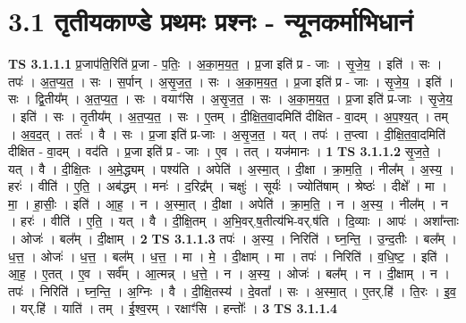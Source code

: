 \documentclass[17pt]{extarticle}
\begin{document}
\section*{ 3.1     तृतीयकाण्डे प्रथमः प्रश्नः - न्यूनकर्माभिधानं }
                                \textbf{ TS 3.1.1.1} \newline
                  प्र॒जाप॑ति॒रिति॑ प्र॒जा - प॒तिः॒ । अ॒का॒म॒य॒त॒ । प्र॒जा इति॑ प्र - जाः । सृ॒जे॒य॒ । इति॑ । सः । तपः॑ । अ॒त॒प्य॒त॒ । सः । स॒र्पान् । अ॒सृ॒ज॒त॒ । सः । अ॒का॒म॒य॒त॒ । प्र॒जा इति॑ प्र - जाः । सृ॒जे॒य॒ । इति॑ । सः । द्वि॒तीय᳚म् । अ॒त॒प्य॒त॒ । सः । वयाꣳ॑सि । अ॒सृ॒ज॒त॒ । सः । अ॒का॒म॒य॒त॒ । प्र॒जा इति॑ प्र-जाः । सृ॒जे॒य॒ । इति॑ । सः । तृ॒तीय᳚म् । अ॒त॒प्य॒त॒ । सः । ए॒तम् । दी॒क्षि॒त॒वा॒दमिति॑ दीक्षित - वा॒दम् । अ॒प॒श्य॒त् । तम् । अ॒व॒द॒त् । ततः॑ । वै । सः । प्र॒जा इति॑ प्र-जाः । अ॒सृ॒ज॒त॒ । यत् । तपः॑ । त॒प्त्वा । दी॒क्षि॒त॒वा॒दमिति॑ दीक्षित - वा॒दम् । वद॑ति । प्र॒जा इति॑ प्र - जाः । ए॒व । तत् । यज॑मानः । \textbf{  1} \newline
                  \newline
                                \textbf{ TS 3.1.1.2} \newline
                  सृ॒ज॒ते॒ । यत् । वै । दी॒क्षि॒तः । अ॒मे॒द्ध्यम् । पश्य॑ति । अपेति॑ । अ॒स्मा॒त् । दी॒क्षा । क्रा॒म॒ति॒ । नील᳚म् । अ॒स्य॒ । हरः॑ । वीति॑ । ए॒ति॒ । अब॑द्धम् । मनः॑ । द॒रिद्र᳚म् । चक्षुः॑ । सूर्यः॑ । ज्योति॑षाम् । श्रेष्ठः॑ । दीक्षे᳚ । मा । मा॒ । हा॒सीः॒ । इति॑ । आ॒ह॒ । न । अ॒स्मा॒त् । दी॒क्षा । अपेति॑ । क्रा॒म॒ति॒ । न । अ॒स्य॒ । नील᳚म् । न । हरः॑ । वीति॑ । ए॒ति॒ । यत् । वै । दी॒क्षि॒तम् । अ॒भि॒वर्.ष॒तीत्य॑भि-वर्.ष॑ति । दि॒व्याः । आपः॑ । अशा᳚न्ताः । ओजः॑ । बल᳚म् । दी॒क्षाम् । \textbf{  2} \newline
                  \newline
                                \textbf{ TS 3.1.1.3} \newline
                  तपः॑ । अ॒स्य॒ । निरिति॑ । घ्न॒न्ति॒ । उ॒न्द॒तीः । बल᳚म् । ध॒त्त॒ । ओजः॑ । ध॒त्त॒ । बल᳚म् । ध॒त्त॒ । मा । मे॒ । दी॒क्षाम् । मा । तपः॑ । निरिति॑ । व॒धि॒ष्ट॒ । इति॑ । आ॒ह॒ । ए॒तत् । ए॒व । सर्व᳚म् । आ॒त्मन्न् । ध॒त्ते॒ । न । अ॒स्य॒ । ओजः॑ । बल᳚म् । न । दी॒क्षाम् । न । तपः॑ । निरिति॑ । घ्न॒न्ति॒ । अ॒ग्निः । वै । दी॒क्षि॒तस्य॑ । दे॒वता᳚ । सः । अ॒स्मा॒त् । ए॒तर्.हि॑ । ति॒रः । इ॒व॒ । यर्.हि॑ । याति॑ । तम् । ई॒श्व॒रम् । रक्षाꣳ॑सि । हन्तोः᳚ । \textbf{  3} \newline
                  \newline
                                \textbf{ TS 3.1.1.4} \newline
\end{document}
